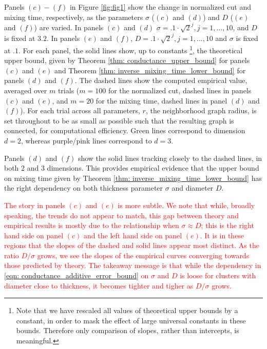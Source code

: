 \documentclass{article}
\newcommand{\1}{\mathbf{1}}
\theoremstyle{aldenthm}
\theoremstyle{aldenrmrk}
\begin{document}
Panels $(c) - (f)$ in Figure \ref{fig:fig1} show the change in normalized cut and mixing time, respectively, as the parameters $\sigma$ ($(c)$ and $(d)$) and $D$ ($(e)$ and $(f)$) are varied. In panels $(c)$ and $(d)$ $\sigma = .1 \cdot \sqrt{2}^j, j = 1,\ldots,10$, and $D$ is fixed at $3.2$. In panels $(e)$ and $(f)$, $D = .1 \cdot \sqrt{2}^j, j = 1,\ldots,10$ and $\sigma$ is fixed at $.1$.
For each panel, the solid lines show, up to constants \footnote{Note that we have rescaled all values of theoretical upper bounds by a constant, in order to mask the effect of large universal constants in these bounds. Therefore only comparison of slopes, rather than intercepts, is meaningful.}, the theoretical upper bound, given by Theorem \ref{thm: conductance_upper_bound} for panels $(c)$ and $(e)$ and Theorem \ref{thm: inverse_mixing_time_lower_bound} for panels $(d)$ and $(f)$. The dashed lines show the computed empirical value, averaged over $m$ trials ($m = 100$ for the normalized cut, dashed lines in panels $(c)$ and $(e)$, and $m = 20$ for the mixing time, dashed lines in panel $(d)$ and $(f)$). For each trial across all parameters, $r$, the neighborhood graph radius, is set throughout to be as small as possible such that the resulting graph is connected, for computational efficiency. Green lines correspond to dimension $d = 2$, whereas purple/pink lines correspond to $d = 3$. 

Panels $(d)$ and $(f)$ show the solid lines tracking closely to the dashed lines, in both 2 and 3 dimensions. This provides empirical evidence that the upper bound on mixing time given by Theorem \ref{thm: inverse_mixing_time_lower_bound} has the right dependency on both thickness parameter  $\sigma$ and diameter $D$.

\textcolor{red}{The story in panels $(c)$ and $(e)$ is more subtle. We note that while, broadly speaking, the trends do not appear to match, this gap between theory and empirical results is mostly due to the relationship when $\sigma \approx D$; this is the right hand side on panel $(c)$ and the left hand side on panel $(e)$. It is in these regions that the slopes of the dashed and solid lines appear most distinct. As the ratio $D/\sigma$ grows, we see the slopes of the empirical curves converging towards those predicted by theory. The takeaway message is that while the dependency in \eqref{eqn: conductance_additive_error_bound} on $\sigma$ and $D$ is loose for clusters with diameter close to thickness, it becomes tighter and tigher as $D/\sigma$ grows.}
\end{document}
